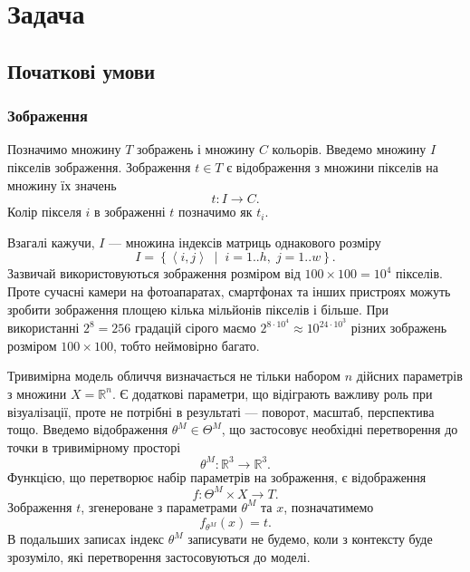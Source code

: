 \section{Задача}

\subsection{Початкові умови}

\subsubsection{Зображення}

Позначимо множину $T$ зображень і множину $C$ кольорів.
Введемо множину $I$ пікселів зображення.
Зображення $t \in T$ є відображення з множини пікселів на множину їх значень
\begin{equation*}
  t: I \rightarrow C.
\end{equation*}
Колір пікселя $i$ в зображенні $t$ позначимо як $t_i$.

Взагалі кажучи, $I$ --- множина індексів матриць однакового розміру
\begin{equation*}
  I = \left\{ \left\langle i, j \right\rangle
    \;\middle|\; i = 1..h,\; j = 1..w \right\}.
\end{equation*}
Зазвичай використовуються зображення розміром від
$100 \times 100 = 10^4$ пікселів.
Проте сучасні камери на фотоапаратах, смартфонах та інших пристроях
можуть зробити зображення площею кілька мільйонів пікселів і більше.
При використанні $2^8 = 256$ градацій сірого маємо
$2^{8 \cdot 10^4} \approx 10^{24 \cdot 10^3}$
різних зображень розміром $100 \times 100$, тобто неймовірно багато.

Тривимірна модель обличчя визначається не тільки набором $n$ дійсних параметрів
з множини $X = \mathbb{R}^n$.
Є додаткові параметри, що відіграють важливу роль при візуалізації,
проте не потрібні в результаті --- поворот, масштаб, перспектива тощо.
Введемо відображення $\theta^M \in \Theta^M$,
що застосовує необхідні перетворення до точки в тривимірному просторі
\begin{equation*}
  \theta^M: \mathbb{R}^3 \rightarrow \mathbb{R}^3.
\end{equation*}
Функцією, що перетворює набір параметрів на зображення, є відображення
\begin{equation*}
  f: \Theta^M \times X \rightarrow T.
\end{equation*}
Зображення $t$, згенероване з параметрами $\theta^M$ та $x$, позначатимемо
\begin{equation*}
  f_{\theta^M} \left( x \right) = t.
\end{equation*}
В подальших записах індекс $\theta^M$ записувати не будемо,
коли з контексту буде зрозуміло, які перетворення застосовуються до моделі.

